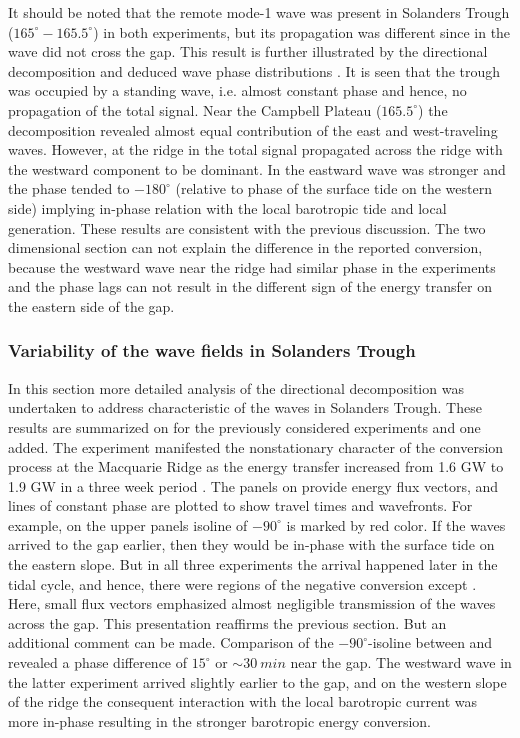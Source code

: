 \documentclass[12pt]{article}
\begin{document}
It should be noted that the remote mode-1 wave was present in Solanders Trough 
($165^{\circ} - 165.5^{\circ}$) in both experiments, but its propagation was different since in 
 the wave did not cross the gap. This result is further illustrated by the directional 
decomposition and deduced wave phase distributions . It is seen that  
the trough was occupied 
by a standing wave, i.e. almost constant phase and hence, no propagation of the total 
signal. 
Near the Campbell Plateau ($165.5^{\circ}$) the decomposition revealed almost equal contribution 
of the east and west-traveling waves. However, at the ridge in  the total signal 
propagated across the ridge with the westward component to be dominant. In  
the eastward wave was stronger and the phase tended to $-180^{\circ}$ (relative to phase of the  
surface tide on the western side) implying in-phase relation with the local barotropic tide and 
local generation. These results are consistent with the previous discussion. The two 
dimensional section can not explain the difference in the reported conversion, because 
the westward wave near the ridge had similar phase in the experiments and the phase lags can not 
result in the different sign of the energy transfer on the eastern side of the gap.\\

\subsubsection{Variability of the wave fields in Solanders Trough}
\label{C3.sec:3d_var}
In this section more detailed analysis of the directional decomposition was 
undertaken to address characteristic of the waves in Solanders Trough. These results are summarized 
on 
 for the previously considered 
experiments and one added. The experiment  manifested the nonstationary 
character of the conversion process at the Macquarie Ridge as the energy transfer increased from 
1.6 GW to 1.9 GW in a three week period . The panels on 
provide energy flux vectors, and lines of constant phase are plotted to show travel times and  
wavefronts. For example, on the upper panels isoline of $-90^{\circ}$ is marked by red color. If 
the 
waves arrived to the gap earlier, then they would be in-phase with the surface tide on the eastern 
slope. But in all three experiments the arrival 
happened later in the tidal cycle, and hence, there were regions of the negative conversion except 
. Here, small flux vectors emphasized almost negligible transmission 
of the waves across the gap. This presentation reaffirms the previous section. But an 
additional comment can be made. Comparison of the $-90^{\circ}$-isoline between  and 
 revealed a phase difference of $15^{\circ}$ or $\sim30~min$ near the gap. The westward 
wave in the latter experiment arrived slightly earlier to the gap, and on the western slope of the 
ridge the consequent interaction with the local barotropic current was more in-phase resulting in 
the stronger barotropic energy conversion.\\
\end{document}
